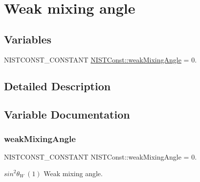 \hypertarget{group___n_i_s_t_const-_weak_mixing_angle}{}\section{Weak mixing angle}
\label{group___n_i_s_t_const-_weak_mixing_angle}
\subsection*{Variables}
\begin{DoxyCompactItemize}
\item 
N\+I\+S\+T\+C\+O\+N\+S\+T\+\_\+\+C\+O\+N\+S\+T\+A\+NT \mbox{\hyperlink{group___n_i_s_t_const-_weak_mixing_angle_ga0dc8fe82146df3a503a0120dc478588a}{N\+I\+S\+T\+Const\+::weak\+Mixing\+Angle}} = 0.
\end{DoxyCompactItemize}


\subsection{Detailed Description}


\subsection{Variable Documentation}
\mbox{\label{group___n_i_s_t_const-_weak_mixing_angle_ga0dc8fe82146df3a503a0120dc478588a}} 
\subsubsection{\texorpdfstring{weak\+Mixing\+Angle}{weakMixingAngle}}
{\footnotesize\ttfamily N\+I\+S\+T\+C\+O\+N\+S\+T\+\_\+\+C\+O\+N\+S\+T\+A\+NT N\+I\+S\+T\+Const\+::weak\+Mixing\+Angle = 0.}

$sin^2 \theta_W \ (1)$ Weak mixing angle. 